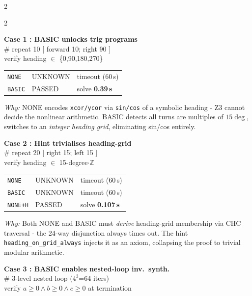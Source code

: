 \begin{multicols}{2}
\begin{multicols}{2}

\noindent\textbf{Case 1 : BASIC unlocks trig programs}\\[2pt]
{\ttfamily\textcolor{gray!60!black}{\# repeat 10 [ forward 10; right 90 ]\\
  verify heading $\in$ \{0,90,180,270\}}}


\begin{tabular}{@{}lll@{}}
\texttt{NONE}  & \textcolor{orange!80!black}{UNKNOWN} & timeout (60\,s) \\
\texttt{BASIC} & \textcolor{green!60!black}{PASSED}  & solve \textbf{0.39\,s} \\
\end{tabular}


{\scriptsize\textit{Why:} NONE encodes \texttt{xcor/ycor} via \texttt{sin/cos} of a symbolic heading - Z3 cannot decide the nonlinear arithmetic.  BASIC detects all turns are multiples of $15\deg$, switches to an \emph{integer heading grid}, eliminating sin/cos entirely.\par}

\bigskip
\noindent\textbf{Case 2 : Hint trivialises heading-grid}\\[2pt]
{\ttfamily\textcolor{gray!60!black}{\# repeat 20 [ right 15; left 15 ]\\
  verify heading $\in$ 15-degree$\cdot\mathbb{Z}$}}


\begin{tabular}{@{}lll@{}}
\texttt{NONE}   & \textcolor{orange!80!black}{UNKNOWN} & timeout (60\,s) \\
\texttt{BASIC}  & \textcolor{orange!80!black}{UNKNOWN} & timeout (60\,s) \\
\texttt{NONE+H} & \textcolor{green!60!black}{PASSED}  & solve \textbf{0.107\,s} \\
\end{tabular}


{\scriptsize\textit{Why:} Both NONE and BASIC must \emph{derive} heading-grid membership via CHC traversal - the 24-way disjunction always times out.  The hint \texttt{heading\_on\_grid\_always} injects it as an axiom, collapsing the proof to trivial modular arithmetic.\par}

\columnbreak

\noindent\textbf{Case 3 : BASIC enables nested-loop inv.\ synth.}\\[2pt]
{\ttfamily\textcolor{gray!60!black}{\# 3-level nested loop ($4^3$=64 iters)\\
  verify $a{\ge}0 \wedge b{\ge}0 \wedge c{\ge}0$ at termination}}



\end{multicols}
\end{multicols}
